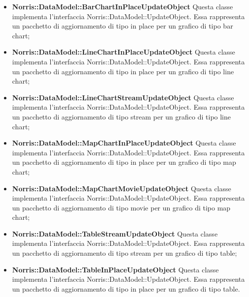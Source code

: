 \begin{itemize}
		\item \textbf{Norris::DataModel::BarChartInPlaceUpdateObject} Questa classe implementa l'interfaccia Norris::DataModel::UpdateObject. Essa rappresenta un pacchetto di aggiornamento di tipo in place per un grafico di tipo bar chart;

		\item \textbf{Norris::DataModel::LineChartInPlaceUpdateObject} Questa classe implementa l'interfaccia Norris::DataModel::UpdateObject. Essa rappresenta un pacchetto di aggiornamento di tipo in place per un grafico di tipo line chart;

		\item \textbf{Norris::DataModel::LineChartStreamUpdateObject} Questa classe implementa l'interfaccia Norris::DataModel::UpdateObject. Essa rappresenta un pacchetto di aggiornamento di tipo stream per un grafico di tipo line chart;

		\item \textbf{Norris::DataModel::MapChartInPlaceUpdateObject} Questa classe implementa l'interfaccia Norris::DataModel::UpdateObject. Essa rappresenta un pacchetto di aggiornamento di tipo in place per un grafico di tipo map chart;

		\item \textbf{Norris::DataModel::MapChartMovieUpdateObject} Questa classe implementa l'interfaccia Norris::DataModel::UpdateObject. Essa rappresenta un pacchetto di aggiornamento di tipo movie per un grafico di tipo map chart;

		\item \textbf{Norris::DataModel::TableStreamUpdateObject} Questa classe implementa l'interfaccia Norris::DataModel::UpdateObject. Essa rappresenta un pacchetto di aggiornamento di tipo stream per un grafico di tipo table;

		\item \textbf{Norris::DataModel::TableInPlaceUpdateObject} Questa classe implementa l'interfaccia Norris::DataModel::UpdateObject. Essa rappresenta un pacchetto di aggiornamento di tipo in place per un grafico di tipo table.
	\end{itemize}
